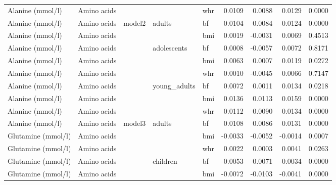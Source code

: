 \documentclass[11pt,twoside]{bristolthesis}
\begin{document}
\begin{longtable}[t]{lllllrrrr}
\cmidrule{1-2}
\cmidrule{5-9}\nopagebreak
Alanine (mmol/l) & Amino acids &  &  & whr & 0.0109 & 0.0088 & 0.0129 & 0.0000\\
\cmidrule{1-2}
\cmidrule{5-9}\nopagebreak
Alanine (mmol/l) & Amino acids & \multirow{-11}{*}{\raggedright\arraybackslash model2} & \multirow{-3}{*}{\raggedright\arraybackslash adults} & bf & 0.0104 & 0.0084 & 0.0124 & 0.0000\\
\cmidrule{1-9}\pagebreak[0]
Alanine (mmol/l) & Amino acids &  &  & bmi & 0.0019 & -0.0031 & 0.0069 & 0.4513\\
\cmidrule{1-2}
\cmidrule{5-9}\nopagebreak
Alanine (mmol/l) & Amino acids &  & \multirow{-2}{*}{\raggedright\arraybackslash adolescents} & bf & 0.0008 & -0.0057 & 0.0072 & 0.8171\\
\cmidrule{1-2}
\cmidrule{4-9}\nopagebreak
Alanine (mmol/l) & Amino acids &  &  & bmi & 0.0063 & 0.0007 & 0.0119 & 0.0272\\
\cmidrule{1-2}
\cmidrule{5-9}\nopagebreak
Alanine (mmol/l) & Amino acids &  &  & whr & 0.0010 & -0.0045 & 0.0066 & 0.7147\\
\cmidrule{1-2}
\cmidrule{5-9}\nopagebreak
Alanine (mmol/l) & Amino acids &  & \multirow{-3}{*}{\raggedright\arraybackslash young\_adults} & bf & 0.0072 & 0.0011 & 0.0134 & 0.0218\\
\cmidrule{1-2}
\cmidrule{4-9}\nopagebreak
Alanine (mmol/l) & Amino acids &  &  & bmi & 0.0136 & 0.0113 & 0.0159 & 0.0000\\
\cmidrule{1-2}
\cmidrule{5-9}\nopagebreak
Alanine (mmol/l) & Amino acids &  &  & whr & 0.0112 & 0.0090 & 0.0134 & 0.0000\\
\cmidrule{1-2}
\cmidrule{5-9}\nopagebreak
Alanine (mmol/l) & Amino acids & \multirow{-8}{*}{\raggedright\arraybackslash model3} & \multirow{-3}{*}{\raggedright\arraybackslash adults} & bf & 0.0108 & 0.0086 & 0.0131 & 0.0000\\
\cmidrule{1-9}\pagebreak[0]
Glutamine (mmol/l) & Amino acids &  &  & bmi & -0.0033 & -0.0052 & -0.0014 & 0.0007\\
\cmidrule{1-2}
\cmidrule{5-9}\nopagebreak
Glutamine (mmol/l) & Amino acids &  &  & whr & 0.0022 & 0.0003 & 0.0041 & 0.0263\\
\cmidrule{1-2}
\cmidrule{5-9}\nopagebreak
Glutamine (mmol/l) & Amino acids &  & \multirow{-3}{*}{\raggedright\arraybackslash children} & bf & -0.0053 & -0.0071 & -0.0034 & 0.0000\\
\cmidrule{1-2}
\cmidrule{4-9}\nopagebreak
Glutamine (mmol/l) & Amino acids &  &  & bmi & -0.0072 & -0.0103 & -0.0041 & 0.0000\\

\end{longtable}
\end{document}
